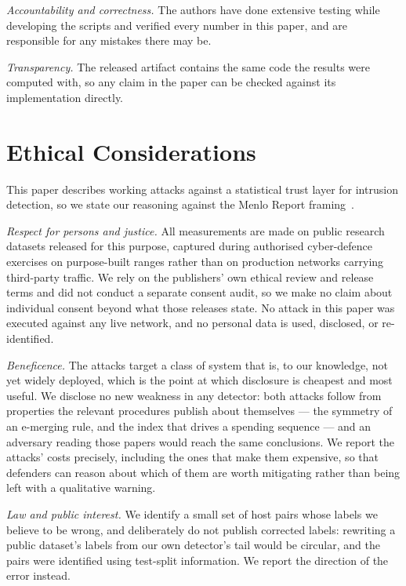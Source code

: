 \documentclass[conference]{IEEEtran}
\begin{document}
\emph{Accountability and correctness.} The authors have done extensive testing while developing the scripts and verified every number in this paper, and are responsible for any mistakes there may be.

\emph{Transparency.} The released artifact contains the same code the results were computed
with, so any claim in the paper can be checked against its implementation directly.

\section*{Ethical Considerations}

This paper describes working attacks against a statistical trust layer for intrusion detection, so we
state our reasoning against the Menlo Report framing~\cite{menlo2012}.

\emph{Respect for persons and justice.} All measurements are made on public research datasets
released for this purpose, captured during authorised cyber-defence exercises on
purpose-built ranges rather than on production networks carrying third-party traffic. We rely on the
publishers' own ethical review and release terms and did not conduct a separate consent audit, so we
make no claim about individual consent beyond what those releases state. No attack in this paper was
executed against any live network, and no personal
data is used, disclosed, or re-identified.

\emph{Beneficence.} The attacks target a class of system that is, to our knowledge, not yet
widely deployed, which is the point at which disclosure is cheapest and most useful. We disclose
no new weakness in any detector: both attacks follow from properties the relevant procedures
publish about themselves --- the symmetry of an e-merging rule, and the index that drives a
spending sequence --- and an adversary reading those papers would reach the same conclusions. We
report the attacks' costs precisely, including the ones that make them expensive, so that
defenders can reason about which of them are worth mitigating rather than being left with a
qualitative warning.

\emph{Law and public interest.} We identify a small set of host pairs whose labels we believe to
be wrong, and deliberately do not publish corrected labels: rewriting a public dataset's labels
from our own detector's tail would be circular, and the pairs were identified using test-split
information. We report the direction of the error instead.
\end{document}
